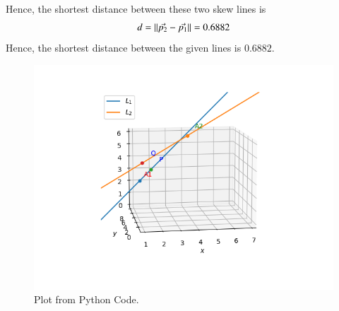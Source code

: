 \documentclass[journal,12pt,twocolumn]{IEEEtran}
\begin{document}
Hence, the shortest distance between these two skew lines is
\begin{align}
    \label{eq:18}
    d = \lVert\Vec{p_{2}}-\Vec{p_{1}}\rVert = 0.6882
\end{align}
Hence, the shortest distance between the given lines is $0.6882$.
\begin{figure}[h]
    \centering
    \includegraphics[scale = 0.6]{figure/Figure_1.png}
    \caption{Plot from Python Code.}
    \label{fig:my_label}
\end{figure}
\end{document}
